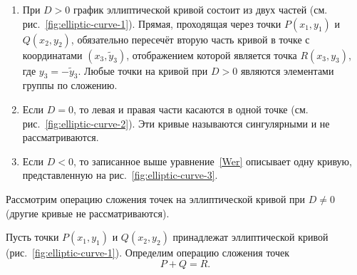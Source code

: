 \begin{enumerate}
    \item При $D>0$ график эллиптической кривой состоит из двух частей (см. рис.~\ref{fig:elliptic-curve-1}). Прямая, проходящая через точки $P(x_1, y_1)$ и $Q(x_2, y_2)$, обязательно пересечёт вторую часть кривой в точке с координатами $(x_3, \widetilde{y}_3)$, отображением которой является точка $R(x_3, y_3)$, где $y_3 = - \widetilde{y}_3$. Любые точки на кривой при $D>0$ являются элементами группы по сложению.
    \item Если $D=0$, то левая и правая части касаются в одной точке (см. рис.~\ref{fig:elliptic-curve-2}). Эти кривые называются сингулярными и не рассматриваются.
    \item Если $D<0$, то записанное выше уравнение~\ref{Wer} описывает одну кривую, представленную на рис.~\ref{fig:elliptic-curve-3}.
\end{enumerate}

Рассмотрим операцию сложения точек на эллиптической кривой при $D \ne 0$ (другие кривые не рассматриваются).

Пусть точки $P(x_1, y_1)$ и $Q(x_2, y_2)$ принадлежат эллиптической кривой (рис.~\ref{fig:elliptic-curve-1}). Определим операцию сложения точек
    \[ P + Q = R. \]


